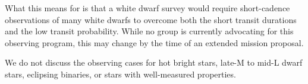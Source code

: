 \begin{enumerate}
	What this means for \tess is that a white dwarf survey would require short-cadence observations of many white dwarfs to overcome both the short transit durations and the low transit probability.
	While no group is currently advocating for this observing program, this may change by the time of an extended mission proposal.

\end{enumerate}

We do not discuss the observing cases for hot bright stars, late-M to mid-L dwarf stars, eclipsing binaries, or stars with well-measured properties.


